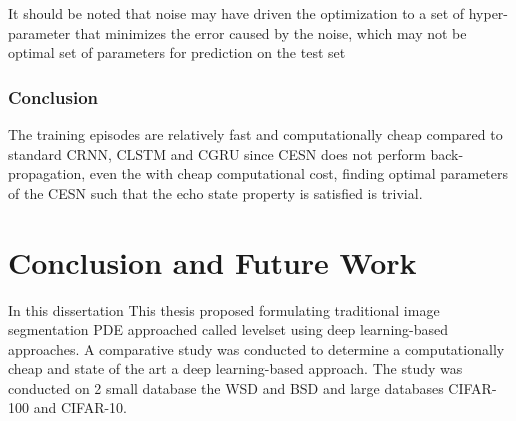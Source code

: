 \documentclass{WitsPhysicsReport}
\begin{document}
It should be noted that noise may  have driven the optimization to a set of hyper-parameter that minimizes the error caused by the noise, which  may not be 
optimal set of parameters for prediction on the test set

\subsubsection{Conclusion}
The training episodes are relatively fast and computationally cheap compared to standard CRNN, CLSTM and CGRU since CESN does not perform back-propagation, even the with cheap computational cost, finding optimal parameters of the CESN such that the echo state property is satisfied is trivial.

\newpage


\section{Conclusion and Future Work}
\label{sec:Discussion_and_Conclusion}

In this dissertation 
This thesis proposed formulating traditional image segmentation PDE approached called levelset using deep learning-based approaches. A comparative study was conducted to determine a computationally cheap and state of the art a deep learning-based approach. The study was conducted on 2 small database the WSD and BSD and large databases CIFAR-100 and CIFAR-10.

\end{document}
